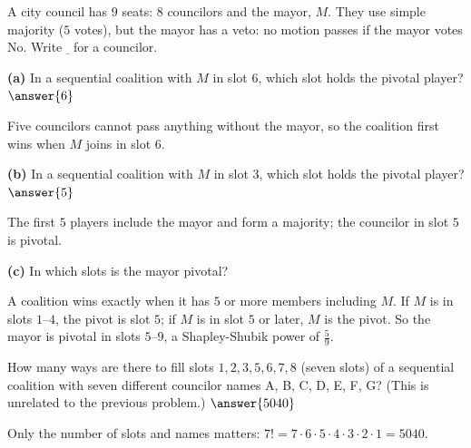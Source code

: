 \documentclass[12pt]{ximera}
\begin{document}
\begin{problem}
A city council has $9$ seats: $8$ councilors and the mayor, $M$. They use simple majority ($5$ votes), but the mayor has a veto: no motion passes if the mayor votes No. Write
$\underline{\ }$ for a councilor.

\begin{prompt}
\textbf{(a)} In a sequential coalition with $M$ in slot $6$, which slot holds the
pivotal player? $\answer{6}$
\begin{feedback}
Five councilors cannot pass anything without the mayor, so the coalition first wins when $M$ joins in slot $6$.
\end{feedback}
\end{prompt}

\begin{prompt}
\textbf{(b)} In a sequential coalition with $M$ in slot $3$, which slot
holds the pivotal player? $\answer{5}$
\begin{feedback}
The first $5$ players include the mayor and form a majority; the councilor in slot $5$ is pivotal.
\end{feedback}
\end{prompt}

\begin{prompt}
\textbf{(c)} In which slots is the mayor pivotal?
\begin{selectAll}
\end{selectAll}
\begin{feedback}
A coalition wins exactly when it has $5$ or more members including $M$. If $M$ is in slots $1$--$4$, the pivot is slot $5$; if $M$ is in slot $5$ or later, $M$ is the pivot. So the mayor is pivotal in slots $5$--$9$, a Shapley-Shubik power of $\frac59$.
\end{feedback}
\end{prompt}
\end{problem}

\begin{problem}
How many ways are there to fill slots $1,2,3,5,6,7,8$ (seven slots) of a sequential coalition
with seven different councilor names A, B, C, D, E, F, G? (This is unrelated to the
previous problem.) $\answer{5040}$
\begin{feedback}
Only the number of slots and names matters: $7!=7\cdot6\cdot5\cdot4\cdot3\cdot2\cdot1=5040$.
\end{feedback}
\end{problem}
\end{document}
